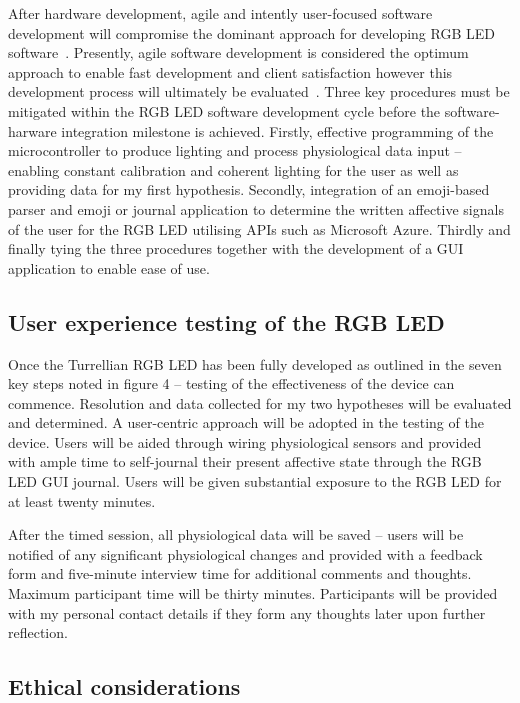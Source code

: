 \documentclass{sigchi}
\begin{document}
After hardware development, agile and intently user-focused software development will compromise the dominant approach for developing RGB LED software~\cite{abrahamsson2017agile, cockburn2006agile}. Presently, agile software development is considered the optimum approach to enable fast development and client satisfaction however this development process will ultimately be evaluated~\cite{abrahamsson2017agile}. Three key procedures must be mitigated within the RGB LED software development cycle before the software-harware integration milestone is achieved. Firstly, effective programming of the microcontroller to produce lighting and process physiological data input – enabling constant calibration and coherent lighting for the user as well as providing data for my first hypothesis. Secondly, integration of an emoji-based parser and emoji or journal application to determine the written affective signals of the user for the RGB LED utilising APIs such as Microsoft Azure. Thirdly and finally tying the three procedures together with the development of a GUI application to enable ease of use. 

\subsection{User experience testing of the RGB LED}

Once the Turrellian RGB LED has been fully developed as outlined in the seven key steps noted in figure 4 – testing of the effectiveness of the device can commence. Resolution and data collected for my two hypotheses will be evaluated and determined. A user-centric approach will be adopted in the testing of the device. Users will be aided through wiring physiological sensors and provided with ample time to self-journal their present affective state through the RGB LED GUI journal. Users will be given substantial exposure to the RGB LED for at least twenty minutes.

After the timed session, all physiological data will be saved – users will be notified of any significant physiological changes and provided with a feedback form and five-minute interview time for additional comments and thoughts. Maximum participant time will be thirty minutes. Participants will be provided with my personal contact details if they form any thoughts later upon further reflection.

\subsection{Ethical considerations}
\end{document}
